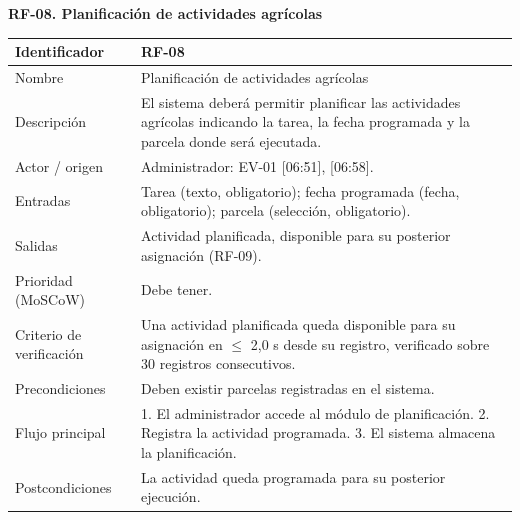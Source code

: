 \documentclass[12pt,a4paper]{article}
\begin{document}
\begin{minipage}{\linewidth}
\bigskip
\noindent\textbf{RF-08. Planificación de actividades agrícolas}
\label{tab:RF-08}

\begin{center}
\begin{tabular}{|p{3.5cm}|p{10.7cm}|}
\hline
Identificador & RF-08 \\
\hline
Nombre & Planificación de actividades agrícolas \\
\hline
Descripción & El sistema deberá permitir planificar las actividades agrícolas indicando la tarea, la fecha programada y la parcela donde será ejecutada. \\
\hline
Actor / origen & Administrador: EV-01 [06:51], [06:58]. \\
\hline
Entradas & Tarea (texto, obligatorio); fecha programada (fecha, obligatorio); parcela (selección, obligatorio). \\
\hline
Salidas & Actividad planificada, disponible para su posterior asignación (RF-09). \\
\hline
Prioridad (MoSCoW) & Debe tener. \\
\hline
Criterio de verificación & Una actividad planificada queda disponible para su asignación en $\leq$ 2,0 s desde su registro, verificado sobre 30 registros consecutivos. \\
\hline
Precondiciones & Deben existir parcelas registradas en el sistema. \\
\hline
Flujo principal & 1. El administrador accede al módulo de planificación. 2. Registra la actividad programada. 3. El sistema almacena la planificación. \\
\hline
Postcondiciones & La actividad queda programada para su posterior ejecución. \\
\hline
\end{tabular}
\end{center}
\end{minipage}
\end{document}
